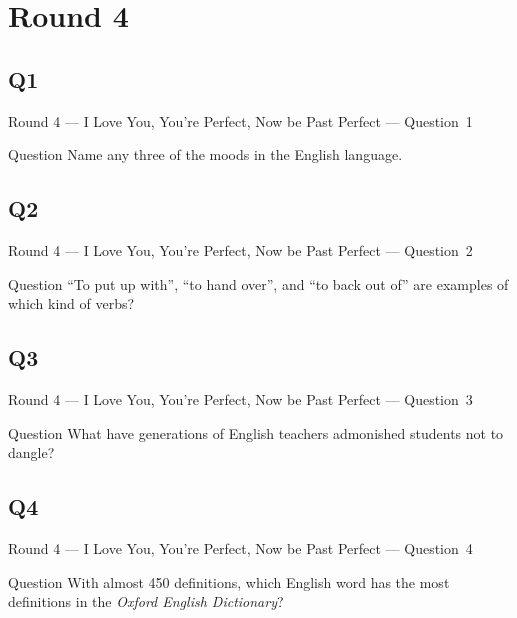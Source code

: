 \documentclass[11pt]{beamer}
\begin{document}
\def\thisSectionName{I Love You, You're Perfect, Now be Past Perfect}
\section{Round 4}
\subsection*{Q1}
\begin{frame}[t]{Round 4 --- I Love You, You're Perfect, Now be Past Perfect --- \mbox{Question 1}}
\vspace{-0.5em}
\begin{block}{Question}
Name any three of the moods in the English language.
\end{block}
\end{frame}
\subsection*{Q2}
\begin{frame}[t]{Round 4 --- I Love You, You're Perfect, Now be Past Perfect --- \mbox{Question 2}}
\vspace{-0.5em}
\begin{block}{Question}
``To put up with'', ``to hand over'', and ``to back out of'' are examples of which kind of verbs? 
\end{block}
\end{frame}
\subsection*{Q3}
\begin{frame}[t]{Round 4 --- I Love You, You're Perfect, Now be Past Perfect --- \mbox{Question 3}}
\vspace{-0.5em}
\begin{block}{Question}
What have generations of English teachers admonished students not to dangle?
\end{block}
\end{frame}
\subsection*{Q4}
\begin{frame}[t]{Round 4 --- I Love You, You're Perfect, Now be Past Perfect --- \mbox{Question 4}}
\vspace{-0.5em}
\begin{block}{Question}
With almost 450 definitions, which English word has the most definitions in the \emph{Oxford English Dictionary}?
\end{block}
\end{frame}
\end{document}
